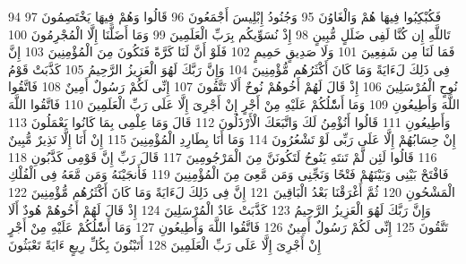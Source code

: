 \documentclass[20pt,a4paper]{article}
\begin{document}
{\tiny\colorbox{cl_aya}{94}} فَكُبْكِبُوا فِيهَا هُمْ وَالْغَاوُنَ
{\tiny\colorbox{cl_aya}{95}} وَجُنُودُ إِبْلِيسَ أَجْمَعُونَ
{\tiny\colorbox{cl_aya}{96}} قَالُوا وَهُمْ فِيهَا يَخْتَصِمُونَ
{\tiny\colorbox{cl_aya}{97}} تَاللَّهِ إِن كُنَّا لَفِى ضَلَلٍ مُّبِينٍ
{\tiny\colorbox{cl_aya}{98}} إِذْ نُسَوِّيكُم بِرَبِّ الْعَلَمِينَ
{\tiny\colorbox{cl_aya}{99}} وَمَا أَضَلَّنَا إِلَّا الْمُجْرِمُونَ
{\tiny\colorbox{cl_aya}{100}} فَمَا لَنَا مِن شَفِعِينَ
{\tiny\colorbox{cl_aya}{101}} وَلَا صَدِيقٍ حَمِيمٍ
{\tiny\colorbox{cl_aya}{102}} فَلَوْ أَنَّ لَنَا كَرَّةً فَنَكُونَ مِنَ الْمُؤْمِنِينَ
{\tiny\colorbox{cl_aya}{103}} إِنَّ فِى ذَلِكَ لَءَايَةً وَمَا كَانَ أَكْثَرُهُم مُّؤْمِنِينَ
{\tiny\colorbox{cl_aya}{104}} وَإِنَّ رَبَّكَ لَهُوَ الْعَزِيزُ الرَّحِيمُ
{\tiny\colorbox{cl_aya}{105}} كَذَّبَتْ قَوْمُ نُوحٍ الْمُرْسَلِينَ
{\tiny\colorbox{cl_aya}{106}} إِذْ قَالَ لَهُمْ أَخُوهُمْ نُوحٌ أَلَا تَتَّقُونَ
{\tiny\colorbox{cl_aya}{107}} إِنِّى لَكُمْ رَسُولٌ أَمِينٌ
{\tiny\colorbox{cl_aya}{108}} فَاتَّقُوا اللَّهَ وَأَطِيعُونِ
{\tiny\colorbox{cl_aya}{109}} وَمَا أَسَْٔلُكُمْ عَلَيْهِ مِنْ أَجْرٍ إِنْ أَجْرِىَ إِلَّا عَلَى رَبِّ الْعَلَمِينَ
{\tiny\colorbox{cl_aya}{110}} فَاتَّقُوا اللَّهَ وَأَطِيعُونِ
{\tiny\colorbox{cl_aya}{111}} قَالُوا أَنُؤْمِنُ لَكَ وَاتَّبَعَكَ الْأَرْذَلُونَ
{\tiny\colorbox{cl_aya}{112}} قَالَ وَمَا عِلْمِى بِمَا كَانُوا يَعْمَلُونَ
{\tiny\colorbox{cl_aya}{113}} إِنْ حِسَابُهُمْ إِلَّا عَلَى رَبِّى لَوْ تَشْعُرُونَ
{\tiny\colorbox{cl_aya}{114}} وَمَا أَنَا بِطَارِدِ الْمُؤْمِنِينَ
{\tiny\colorbox{cl_aya}{115}} إِنْ أَنَا إِلَّا نَذِيرٌ مُّبِينٌ
{\tiny\colorbox{cl_aya}{116}} قَالُوا لَئِن لَّمْ تَنتَهِ يَنُوحُ لَتَكُونَنَّ مِنَ الْمَرْجُومِينَ
{\tiny\colorbox{cl_aya}{117}} قَالَ رَبِّ إِنَّ قَوْمِى كَذَّبُونِ
{\tiny\colorbox{cl_aya}{118}} فَافْتَحْ بَيْنِى وَبَيْنَهُمْ فَتْحًا وَنَجِّنِى وَمَن مَّعِىَ مِنَ الْمُؤْمِنِينَ
{\tiny\colorbox{cl_aya}{119}} فَأَنجَيْنَهُ وَمَن مَّعَهُ فِى الْفُلْكِ الْمَشْحُونِ
{\tiny\colorbox{cl_aya}{120}} ثُمَّ أَغْرَقْنَا بَعْدُ الْبَاقِينَ
{\tiny\colorbox{cl_aya}{121}} إِنَّ فِى ذَلِكَ لَءَايَةً وَمَا كَانَ أَكْثَرُهُم مُّؤْمِنِينَ
{\tiny\colorbox{cl_aya}{122}} وَإِنَّ رَبَّكَ لَهُوَ الْعَزِيزُ الرَّحِيمُ
{\tiny\colorbox{cl_aya}{123}} كَذَّبَتْ عَادٌ الْمُرْسَلِينَ
{\tiny\colorbox{cl_aya}{124}} إِذْ قَالَ لَهُمْ أَخُوهُمْ هُودٌ أَلَا تَتَّقُونَ
{\tiny\colorbox{cl_aya}{125}} إِنِّى لَكُمْ رَسُولٌ أَمِينٌ
{\tiny\colorbox{cl_aya}{126}} فَاتَّقُوا اللَّهَ وَأَطِيعُونِ
{\tiny\colorbox{cl_aya}{127}} وَمَا أَسَْٔلُكُمْ عَلَيْهِ مِنْ أَجْرٍ إِنْ أَجْرِىَ إِلَّا عَلَى رَبِّ الْعَلَمِينَ
{\tiny\colorbox{cl_aya}{128}} أَتَبْنُونَ بِكُلِّ رِيعٍ ءَايَةً تَعْبَثُونَ
\end{document}
